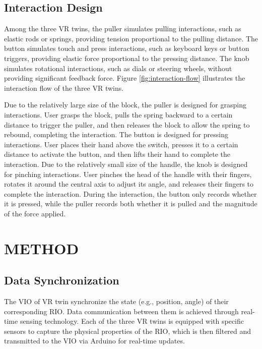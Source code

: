 \documentclass[sigconf,review,anonymous]{acmart}
\begin{document}
\subsection{Interaction Design}
Among the three VR twins, the puller simulates pulling interactions, such as elastic rods or springs, providing tension proportional to the pulling distance. The button simulates touch and press interactions, such as keyboard keys or button triggers, providing elastic force proportional to the pressing distance. The knob simulates rotational interactions, such as dials or steering wheels, without providing significant feedback force. Figure \ref{fig:interaction-flow} illustrates the interaction flow of the three VR twins.

Due to the relatively large size of the block, the puller is designed for grasping interactions. User grasps the block, pulls the spring backward to a certain distance to trigger the puller, and then releases the block to allow the spring to rebound, completing the interaction. The button is designed for pressing interactions. User places their hand above the switch, presses it to a certain distance to activate the button, and then lifts their hand to complete the interaction. Due to the relatively small size of the handle, the knob is designed for pinching interactions. User pinches the head of the handle with their fingers, rotates it around the central axis to adjust its angle, and releases their fingers to complete the interaction. During the interaction, the button only records whether it is pressed, while the puller records both whether it is pulled and the magnitude of the force applied.

\section{METHOD}
\subsection{Data Synchronization}
The VIO of VR twin synchronize the state (e.g., position, angle) of their corresponding RIO. Data communication between them is achieved through real-time sensing technology. Each of the three VR twins is equipped with specific sensors to capture the physical properties of the RIO, which is then filtered and transmitted to the VIO via Arduino for real-time updates.
\end{document}
